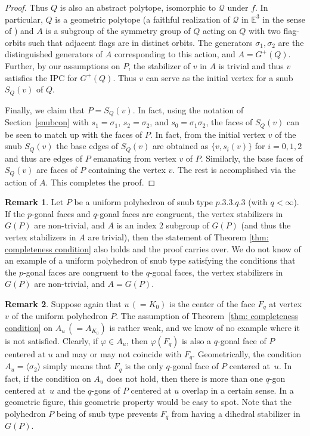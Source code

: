 \documentclass[12pt]{article}
\theoremstyle{definition}\newtheorem{definition}{Definition}[section]
\newtheorem{remark}{Remark}[]
\begin{document}
\begin{proof}
Thus $Q$ is also an abstract polytope, isomorphic to $\mathcal{Q}$ under $f$. In particular, $Q$ is a geometric polytope (a faithful realization of $\mathcal{Q}$ in $\mathbb{E}^3$ in the sense of \cite{41}) and $A$ is a subgroup of the symmetry group of $Q$ acting on $Q$ with two flag-orbits such that adjacent flags are in distinct orbits. The generators $\sigma_1,\sigma_2$ are the distinguished generators of $A$ corresponding to this action, and $A=G^+(Q)$. Further, by our assumptions on $P$, the stabilizer of $v$ in $A$ is trivial and thus $v$ satisfies the IPC for $G^+(Q)$.
Thus $v$ can serve as the initial vertex for a snub ${S}_Q(v)$ of $Q$. 
\smallskip

Finally, we claim that $P={S}_Q(v)$. In fact, using the notation of Section~\ref{snubcon} with $s_1=\sigma_1$, $s_2=\sigma_2$, and $s_0=\sigma_1\sigma_2$, the faces of ${S}_Q(v)$ can be seen to match up with the faces of $P$. In fact, from the initial vertex $v$ of the snub ${S}_Q(v)$ the base edges of ${S}_Q(v)$ are obtained as $\{v,s_i(v)\}$ for $i=0,1,2$ and thus are edges of $P$ emanating from vertex $v$ of $P$. Similarly, the base faces of ${S}_Q(v)$ are faces of $P$ containing the vertex $v$. The rest is accomplished via the action of $A$. This completes the proof.
\end{proof}
\smallskip

\begin{remark}
    Let $P$ be a uniform polyhedron of snub type $p.3.3.q.3$ (with $q<\infty$). If the $p$-gonal faces and $q$-gonal faces are congruent, the vertex stabilizers in $G(P)$ are non-trivial, and $A$ is an index $2$ subgroup of $G(P)$ (and thus the vertex stabilizers in $A$ are trivial), then the statement of Theorem \ref{thm: completeness condition} also holds and the proof carries over. We do not know of an example of a uniform polyhedron of snub type satisfying the conditions that the $p$-gonal faces are congruent to the $q$-gonal faces, the vertex stabilizers in $G(P)$ are non-trivial, and $A=G(P)$. 
\end{remark}

\begin{remark}
\label{stab-u}
Suppose again that $u\,(=K_0)$ is the center of the face $F_q$ at vertex $v$ of the uniform polyhedron $P$. The assumption of Theorem~\ref{thm: completeness condition} on $A_u\,(=A_{K_0})$ is rather weak,  and we know of no example where it is not satisfied. Clearly, if $\varphi\in A_u$, then $\varphi(F_q)$ is also a $q$-gonal face of $P$ centered at $u$ and may or may not coincide with $F_q$. Geometrically, the condition $A_{u} = \langle \sigma_2 \rangle$ simply means that $F_q$ is the only $q$-gonal face of $P$ centered at~$u$. In fact, if the condition on $A_u$ does not hold, then there is more than one $q$-gon centered at~$u$ and the $q$-gons of $P$ centered at $u$ overlap in a certain sense. In a geometric figure, this geometric property would be easy to spot. Note that the polyhedron $P$ being of snub type prevents $F_q$ from having a dihedral stabilizer in $G(P)$. 
\end{remark}
\smallskip
\end{document}
